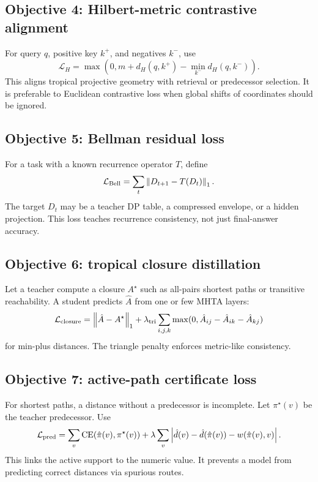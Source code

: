 \documentclass[11pt]{article}
\newcommand{\calL}{\mathcal{L}}
\newcommand{\norm}[1]{\left\lVert #1\right\rVert}
\begin{document}
\subsection{Objective 4: Hilbert-metric contrastive alignment}

For query \(q\), positive key \(k^+\), and negatives \(k^-\), use
\begin{equation}
\calL_H=\max\left(0,m+d_H(q,k^+)-\min_{k^-}d_H(q,k^-)\right).
\end{equation}
This aligns tropical projective geometry with retrieval or predecessor selection.  It is preferable to Euclidean contrastive loss when global shifts of coordinates should be ignored.

\subsection{Objective 5: Bellman residual loss}

For a task with a known recurrence operator \(T\), define
\begin{equation}
\calL_{\rm Bell}=\sum_t\norm{D_{t+1}-T(D_t)}_1.
\end{equation}
The target \(D_t\) may be a teacher DP table, a compressed envelope, or a hidden projection.  This loss teaches recurrence consistency, not just final-answer accuracy.

\subsection{Objective 6: tropical closure distillation}

Let a teacher compute a closure \(A^\star\) such as all-pairs shortest paths or transitive reachability.  A student predicts \(\hat A\) from one or few MHTA layers:
\begin{equation}
\calL_{\rm closure}=\norm{\hat A-A^\star}_1+\lambda_{\rm tri}\sum_{i,j,k}\max(0,\hat A_{ij}-\hat A_{ik}-\hat A_{kj})
\end{equation}
for min-plus distances.  The triangle penalty enforces metric-like consistency.

\subsection{Objective 7: active-path certificate loss}

For shortest paths, a distance without a predecessor is incomplete.  Let \(\pi^\star(v)\) be the teacher predecessor.  Use
\begin{equation}
\calL_{\rm pred}=\sum_v\operatorname{CE}(\hat\pi(v),\pi^\star(v))+\lambda\sum_v\left|\hat d(v)-\hat d(\hat\pi(v))-w(\hat\pi(v),v)\right|.
\end{equation}
This links the active support to the numeric value.  It prevents a model from predicting correct distances via spurious routes.
\end{document}
